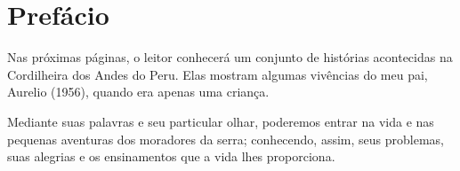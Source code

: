 \cleardoublepage
\newpage
\thispagestyle{empty}
\vfill


\chapter*{Prefácio} %

Nas próximas páginas, o leitor conhecerá um conjunto de histórias acontecidas na Cordilheira dos Andes do Peru. Elas mostram algumas vivências do meu pai, Aurelio (1956), quando era apenas uma criança.

Mediante suas palavras e seu particular olhar, poderemos entrar na vida e nas pequenas aventuras dos moradores da serra; conhecendo, assim, seus problemas, suas alegrias e os ensinamentos que a vida lhes proporciona. 
\vfill

\newpage
\thispagestyle{empty}
